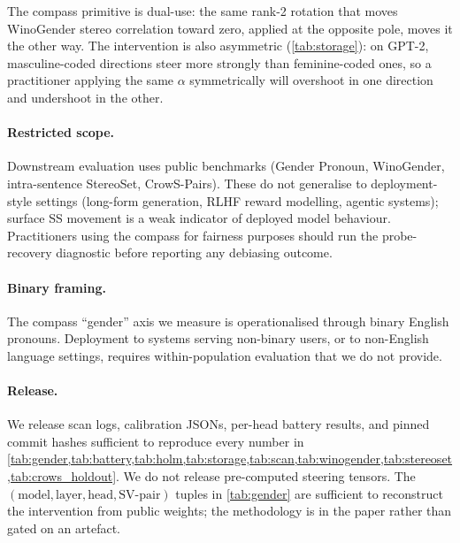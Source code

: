 The compass primitive is dual-use: the same rank-2 rotation that
moves WinoGender stereo correlation toward zero, applied at the
opposite pole, moves it the other way. The intervention is also
asymmetric (\cref{tab:storage}): on GPT-2, masculine-coded
directions steer more strongly than feminine-coded ones, so a
practitioner applying the same $\alpha$ symmetrically will overshoot
in one direction and undershoot in the other.

\paragraph{Restricted scope.}
Downstream evaluation uses public benchmarks (Gender Pronoun,
WinoGender, intra-sentence StereoSet, CrowS-Pairs). These do not
generalise to deployment-style settings (long-form generation, RLHF
reward modelling, agentic systems); surface SS movement is a weak
indicator of deployed model behaviour. Practitioners using the
compass for fairness purposes should run the
\citet{gonen2019lipstick} probe-recovery diagnostic before
reporting any debiasing outcome.

\paragraph{Binary framing.}
The compass ``gender'' axis we measure is operationalised through
binary English pronouns. Deployment to systems serving non-binary
users, or to non-English language settings, requires
within-population evaluation that we do not provide.

\paragraph{Release.}
We release scan logs, calibration JSONs, per-head battery results,
and pinned commit hashes sufficient to reproduce every number in
\cref{tab:gender,tab:battery,tab:holm,tab:storage,tab:scan,tab:winogender,tab:stereoset,tab:crows_holdout}.
We do not release pre-computed steering tensors. The
$(\text{model}, \text{layer}, \text{head}, \mathrm{SV}\text{-pair})$
tuples in \cref{tab:gender} are sufficient to reconstruct the
intervention from public weights; the methodology is in the paper
rather than gated on an artefact.
